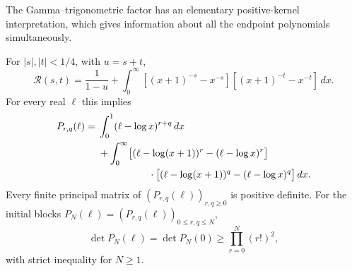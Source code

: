 The Gamma--trigonometric factor has an elementary positive-kernel
interpretation, which gives information about all the endpoint
polynomials simultaneously.

\begin{theorem}\label{thm:endpoint-gram}
For $|s|,|t|<1/4$, with $u=s+t$,
\begin{equation}\label{eq:R-integral}
 \mathcal R(s,t)=\frac1{1-u}+
 \int_0^\infty
 [(x+1)^{-s}-x^{-s}][(x+1)^{-t}-x^{-t}]\,dx.
\end{equation}
For every real $\ell$ this implies
\begin{align}
 P_{r,q}(\ell)={}&\int_0^1(\ell-\log x)^{r+q}\,dx\notag\\
 &+\int_0^\infty
 \bigl[(\ell-\log(x+1))^r-(\ell-\log x)^r\bigr]\notag\\
 &\hspace{18mm}\cdot
 \bigl[(\ell-\log(x+1))^q-(\ell-\log x)^q\bigr]\,dx.
 \label{eq:P-gram}
\end{align}
Every finite principal matrix of $(P_{r,q}(\ell))_{r,q\geq0}$ is
positive definite. For the initial blocks
$P_N(\ell)=(P_{r,q}(\ell))_{0\leq r,q\leq N}$,
\begin{equation}\label{eq:P-determinant}
 \det P_N(\ell)=\det P_N(0)\geq\prod_{r=0}^N(r!)^2,
\end{equation}
with strict inequality for $N\geq1$.
\end{theorem}

